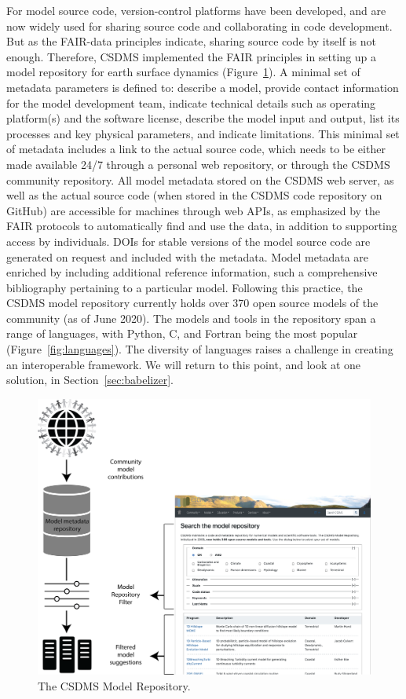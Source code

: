 \documentclass[12pt]{amsart}
\begin{document}
For model source code, version-control platforms have been developed, and are now widely used for sharing source code and collaborating in code development. But as the FAIR-data principles indicate, sharing source code by itself is not enough. Therefore, CSDMS implemented the FAIR principles in setting up a model repository for earth surface dynamics (Figure~\ref{fig:repo}). A minimal set of metadata parameters is defined to: describe a model, provide contact information for the model development team, indicate technical details such as operating platform(s) and the software license, describe the model input and output, list its processes and key physical parameters, and indicate limitations. This minimal set of metadata includes a link to the actual source code, which needs to be either made available 24/7 through a personal web repository, or through the CSDMS community repository. All model metadata stored on the CSDMS web server, as well as the actual source code (when stored in the CSDMS code repository on GitHub) are accessible for machines through web APIs, as emphasized by the FAIR protocols to automatically find and use the data, in addition to supporting access by individuals. DOIs for stable versions of the model source code are generated on request and included with the metadata. Model metadata are enriched by including additional reference information, such a comprehensive bibliography pertaining to a particular model. Following this practice, the CSDMS model repository currently holds over 370 open source models of the community (as of June 2020). The models and tools in the repository span a range of languages, with Python, C, and Fortran being the most popular (Figure~\ref{fig:languages}). The diversity of languages raises a challenge in creating an interoperable framework. We will return to this point, and look at one solution, in Section~\ref{sec:babelizer}.

\begin{figure}[h!]
\centering
\includegraphics[width=6in]{Figures/model_repository.png}
\caption{The CSDMS Model Repository.}
\label{fig:repo}
\end{figure}
\end{document}
